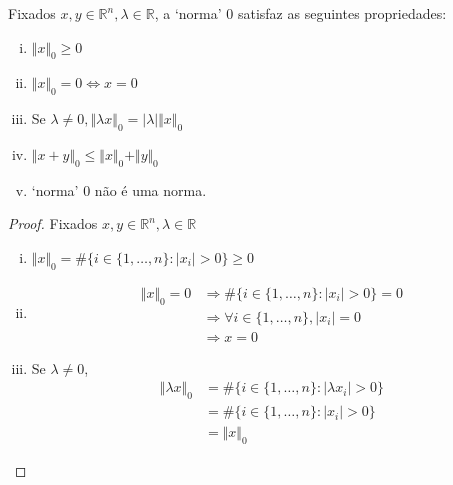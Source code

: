 \begin{proposicao}
Fixados $x, y \in \mathbb{R}^n, \lambda \in \mathbb{R}$, a `norma' $0$ satisfaz as seguintes propriedades:
\begin{enumerate}[(i)]
\item $\Vert x \Vert_0 \geq 0$
\item $\Vert x \Vert_0 = 0 \Leftrightarrow x = 0$
\item Se $\lambda \neq 0, \Vert \lambda x \Vert_0 = \vert \lambda \vert \Vert x \Vert_0$
\item $\Vert x + y \Vert_0 \leq \Vert x \Vert_0 + \Vert y \Vert_0$
\item `norma' $0$ não é uma norma.
\end{enumerate}
\label{prp:norma_0}
\end{proposicao}
\begin{proof}

Fixados $x, y \in \mathbb{R}^n, \lambda \in \mathbb{R}$

\begin{enumerate}[(i)]
\item $\Vert x \Vert_0 = \# \lbrace i \in \lbrace 1, \hdots, n \rbrace: \vert x_i \vert > 0 \rbrace \geq 0$
\item \begin{subequations}
\begin{align*}
\Vert x \Vert_0 = 0 &
\Rightarrow \# \lbrace i \in \lbrace 1, \hdots, n \rbrace: \vert x_i \vert > 0 \rbrace = 0 \\
& \Rightarrow \forall i \in \lbrace 1, \hdots, n \rbrace, \vert x_i \vert = 0 \\
& \Rightarrow x = 0
\end{align*}
\end{subequations}
\item Se $\lambda \neq 0$,
\begin{subequations}
\begin{align*}
\Vert \lambda x \Vert_0 & = \# \lbrace i \in \lbrace 1, \hdots, n \rbrace: \vert \lambda x_i \vert > 0 \rbrace \\
& = \# \lbrace i \in \lbrace 1, \hdots, n \rbrace: \vert x_i \vert > 0 \rbrace\\
& = \Vert x \Vert_0
\end{align*}
\end{subequations}


\end{enumerate}
\end{proof}
